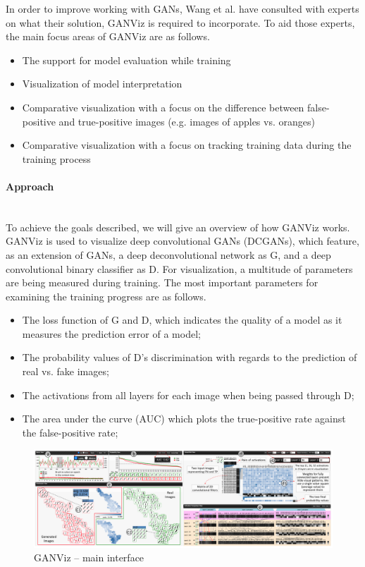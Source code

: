 \documentclass{acmsiggraph}               %
\newcommand{\paragraphbr}[1]{\paragraph{#1}\mbox{}\\}
\begin{document}
In order to improve working with GANs, Wang et al. have consulted with experts on what their solution, GANViz is required to incorporate. To aid those experts, the main focus areas of GANViz are as follows.

\begin{itemize}
  \item The support for model evaluation while training
  \item Visualization of model interpretation
  \item Comparative visualization with a focus on the difference between false-positive and true-positive images (e.g. images of apples vs. oranges)
  \item Comparative visualization with a focus on tracking training data during the training process
\end{itemize}

\paragraphbr{Approach}

To achieve the goals described, we will give an overview of how GANViz works. GANViz is used to visualize deep convolutional GANs (DCGANs), which feature, as an extension of GANs, a deep deconvolutional network as G, and a deep convolutional binary classifier as D. For visualization, a multitude of parameters are being measured during training. The most important parameters for examining the training progress are as follows.

\begin{itemize}
  \item The loss function of G and D, which indicates the quality of a model as it measures the prediction error of a model;
  \item The probability values of D's discrimination with regards to the prediction of real vs. fake images;
  \item The activations from all layers for each image when being passed through D;
  \item The area under the curve (AUC) which plots the true-positive rate against the false-positive rate;
\end{itemize}

\begin{figure}
  \centering
  \includegraphics[width=\textwidth]{ganviz}
  \caption{GANViz -- main interface \protect\cite{Wang}}
  \label{fig:ganviz}
\end{figure}
\end{document}
